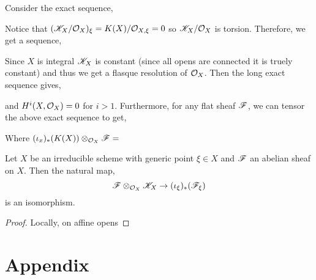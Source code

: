 \documentclass[12pt]{article}
\begin{document}
Consider the exact sequence,
\begin{center}
\end{center}
Notice that $(\mathscr{K}_X / \mathcal{O}_{X})_\xi = K(X) / \mathcal{O}_{X, \xi} = 0$ so $\mathscr{K}_X / \mathcal{O}_{X}$ is torsion. Therefore, we get a sequence,
\begin{center}
\end{center}
Since $X$ is integral $\mathscr{K}_X$ is constant (since all opens are connected it is truely constant) and thus we get a flasque resolution of $\mathcal{O}_{X}$. Then the long exact sequence gives,
\begin{center}
\end{center}
and $H^i(X, \mathcal{O}_{X}) = 0$ for $i > 1$. Furthermore, for any flat sheaf $\mathscr{F}$, we can tensor the above exact sequence to get,
\begin{center}
\end{center}
Where $(\iota_x)_*(K(X)) \otimes_{\mathcal{O}_{X}} \mathscr{F} = $ 

\begin{lemma}
Let $X$ be an irreducible scheme with generic point $\xi \in X$ and $\mathscr{F}$ an abelian sheaf on $X$. Then the natural map,
\[ \mathscr{F} \otimes_{\mathcal{O}_{X}} \mathscr{K}_X \to (\iota_\xi)_* (\mathscr{F}_\xi) \]
is an isomorphism.
\end{lemma}

\begin{proof}
Locally, on affine opens 
\end{proof}


\section{Appendix}
\end{document}
